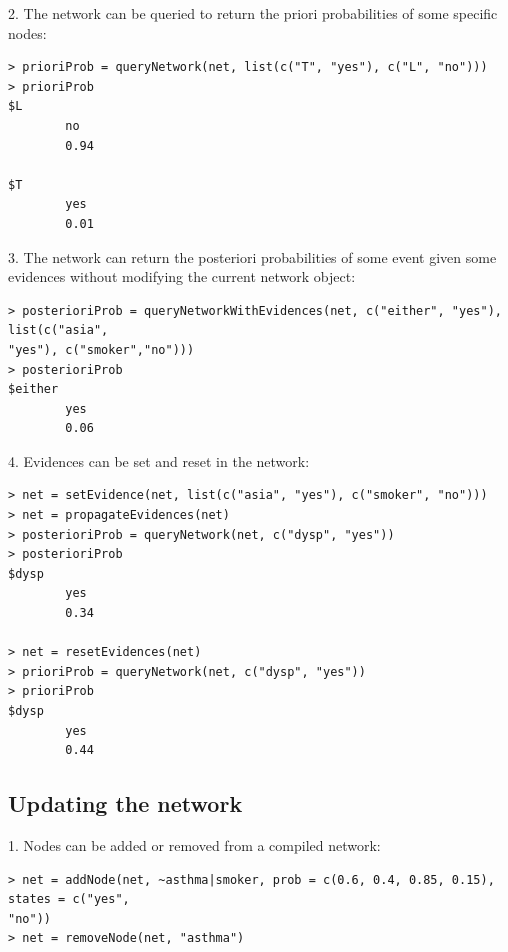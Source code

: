 \documentclass{article}
\begin{document}
2. The network can be queried to return the priori probabilities of some specific nodes:

\begin{verbatim}
> prioriProb = queryNetwork(net, list(c("T", "yes"), c("L", "no")))
> prioriProb
$L
		no
		0.94

$T
		yes
		0.01
\end{verbatim}


3. The network can return the posteriori probabilities of some event given some evidences without modifying the current network object:

\begin{verbatim}
> posterioriProb = queryNetworkWithEvidences(net, c("either", "yes"), list(c("asia",
"yes"), c("smoker","no")))
> posterioriProb
$either
		yes
		0.06
\end{verbatim}


4. Evidences can be set and reset in the network:

\begin{verbatim}
> net = setEvidence(net, list(c("asia", "yes"), c("smoker", "no")))
> net = propagateEvidences(net)
> posterioriProb = queryNetwork(net, c("dysp", "yes"))
> posterioriProb
$dysp
		yes
		0.34

> net = resetEvidences(net)
> prioriProb = queryNetwork(net, c("dysp", "yes"))
> prioriProb
$dysp
		yes
		0.44

\end{verbatim}


\subsection{Updating the network}

1. Nodes can be added or removed from a compiled network:

\begin{verbatim}
> net = addNode(net, ~asthma|smoker, prob = c(0.6, 0.4, 0.85, 0.15), states = c("yes",
"no"))
> net = removeNode(net, "asthma")
\end{verbatim}















\end{document}
